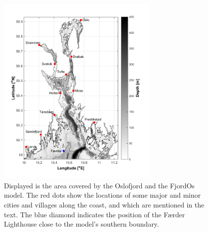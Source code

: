\begin{figure}[htb]
	\centerline{\includegraphics*[trim=0cm 0.9cm 0cm 0cm,clip=true,width=0.7\textwidth]{Figurer/kart} }
	\caption{\small Displayed is the area covered by the Oslofjord and the FjordOs model. The red dots show the locations of some major and minor cities and villages along the coast, and which are mentioned in the text. The blue diamond indicates the position of the F{\ae}rder Lighthouse close to the model's southern boundary.}
	\label{fig:kart}
\end{figure}




